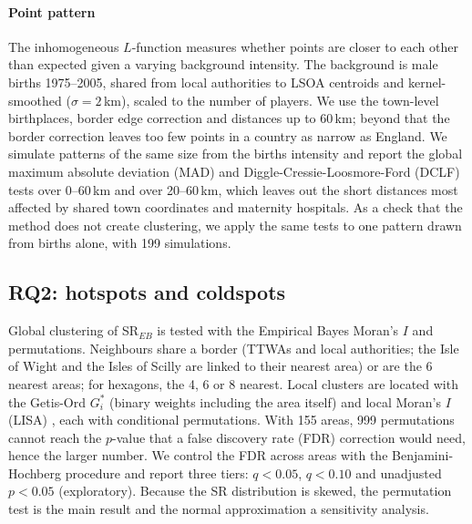 \paragraph{Point pattern} The inhomogeneous $L$-function \cite{baddeley2000,baddeley2015} measures whether points are closer to each other than expected given a varying background intensity. The background is male births 1975--2005, shared from local authorities to LSOA centroids and kernel-smoothed ($\sigma = 2$\,km), scaled to the number of players. We use the \nTown{} town-level birthplaces, border edge correction and distances up to 60\,km; beyond that the border correction leaves too few points in a country as narrow as England. We simulate \nSim{} patterns of the same size from the births intensity and report the global maximum absolute deviation (MAD) and Diggle-Cressie-Loosmore-Ford (DCLF) tests over 0--60\,km and over 20--60\,km, which leaves out the short distances most affected by shared town coordinates and maternity hospitals. As a check that the method does not create clustering, we apply the same tests to one pattern drawn from births alone, with 199 simulations.

\subsection{RQ2: hotspots and coldspots}
Global clustering of SR$_{EB}$ is tested with the Empirical Bayes Moran's $I$ \cite{assuncao1999} and \nSim{} permutations. Neighbours share a border (TTWAs and local authorities; the Isle of Wight and the Isles of Scilly are linked to their nearest area) or are the 6 nearest areas; for hexagons, the 4, 6 or 8 nearest. Local clusters are located with the Getis-Ord $G_i^*$ \cite{getis1992} (binary weights including the area itself) and local Moran's $I$ (LISA) \cite{anselin1995}, each with \nPerm{} conditional permutations. With 155 areas, 999 permutations cannot reach the $p$-value that a false discovery rate (FDR) correction would need, hence the larger number. We control the FDR across areas with the Benjamini-Hochberg procedure \cite{benjamini1995} and report three tiers: $q<0.05$, $q<0.10$ and unadjusted $p<0.05$ (exploratory). Because the SR distribution is skewed, the permutation test is the main result and the normal approximation a sensitivity analysis.


